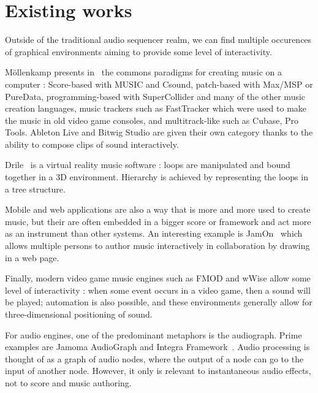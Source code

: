 \documentclass{article}
\begin{document}


\section{Existing works}
Outside of the traditional audio sequencer realm, we can find 
multiple occurences of graphical environments aiming to provide 
some level of interactivity.

M{\"o}llenkamp presents in~\cite{mollenkampparadigms} the 
commons paradigms for creating music on a computer : Score-based with MUSIC and Csound, 
patch-based with Max/MSP or PureData, programming-based with SuperCollider and many of the other music creation languages, music trackers such as FastTracker which were used to make the music in old video game consoles, and multitrack-like such as Cubase, Pro Tools.
Ableton Live and Bitwig Studio are given their own category thanks to the ability to compose clips of sound interactively.

Drile~\cite{berthaut2010drile} is a virtual reality music software : loops are manipulated and bound together in a 3D environment. Hierarchy is achieved by representing the loops in a tree structure.

Mobile and web applications are also a way that is more and more used to create music, 
but their are often embedded in a bigger score or framework and act more as an instrument than other systems.
An interesting example is JamOn~\cite{rosselet2013jam} which allows multiple persons to author music interactively in collaboration by drawing in a web page.

Finally, modern video game music engines such as FMOD and wWise allow some level of interactivity : when some event occurs in a video game, then a sound will be played; automation is also possible, and these environments generally allow for three-dimensional positioning of sound.

For audio engines, one of the predominant metaphors is the audiograph.
Prime examples are Jamoma AudioGraph\cite{place2010jamoma} and Integra Framework~\cite{bullock2011integra}.
Audio processing is thought of as a graph of audio nodes, where the output of a node can go to the input of another node.
However, it only is relevant to instantaneous audio effects, not to score and music authoring.
\end{document}
